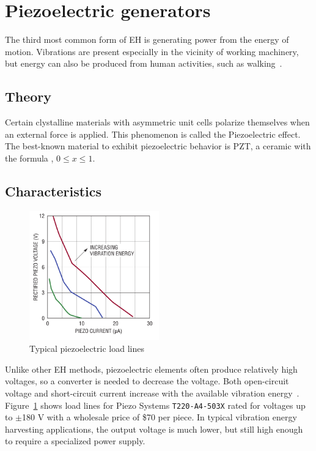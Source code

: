 \documentclass[a4paper,10pt]{article}
\begin{document}
\section{Piezoelectric generators}

The third most common form of \ac{EH} is generating power from the energy of motion. Vibrations are present especially in the vicinity of working machinery, but energy can also be produced from human activities, such as walking~\cite{piezo-shoe-ieee}. 

\subsection{Theory}

Certain clystalline materials with asymmetric unit cells polarize themselves when an external force is applied. This phenomenon is called the Piezoelectric effect. The best-known material to exhibit piezoelectric behavior is \ac{PZT}, a ceramic with the formula , $0\leq x \leq 1$.

\subsection{Characteristics}

\begin{figure}[h!]
\centering
  \includegraphics[width=0.5\textwidth]{./Slike/Piezo-UI}
\caption{Typical piezoelectric load lines~\cite{LT-Piezo}}
\label{fig:piezo-load}
\end{figure}

Unlike other \ac{EH} methods, piezoelectric elements often produce relatively high voltages, so a converter is needed to decrease the voltage. Both open-circuit voltage and short-circuit current increase with the available vibration energy~\cite{LT-Piezo}. Figure~\ref{fig:piezo-load} shows load lines for Piezo Systems \texttt{T220-A4-503X} rated for voltages up to $\pm$180 V with a wholesale price of \$70 per piece. In typical vibration energy harvesting applications, the output voltage is much lower, but still high enough to require a specialized power supply. 
\end{document}
